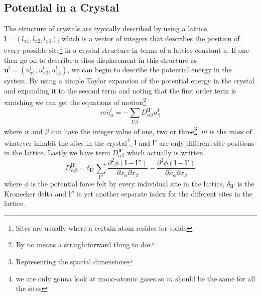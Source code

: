 \documentclass[11pt]{article}
\begin{document}
\subsection{Potential in a Crystal}
The structure of crystals are typically described by using a lattice $\mathbf{l} = (l_{x1}, l_{x2}, l_{x3})$, which is a vector of integers that describes the position of every possible site\footnote{Sites are usually where a certain atom resides for solids} in a crystal structure in terms of a lattice constant $a$. If one then go on to describe a sites displacement in this structure as $\mathbf{u}^l = (u^l_{x1},u^l_{x2},u^l_{x3})$, we can begin to describe the potential energy in the system. By using a simple Taylor expansion of the potential energy in the crystal and expanding it to the second term and noting that the first order term is vanishing we can get the equations of motion\footnote{By no means a straightforward thing  to do} 
\begin{equation}
	m \ddot{u}^l_{\alpha} = - \sum_{\mathbf{l}'\beta} D^{\mathbf{l}\mathbf{l}'}_{\alpha \beta} u^{\mathbf{l}'}_{\beta}
	\label{eq:motion}
\end{equation}
where $\alpha$ and $\beta$ can have the integer value of one, two or three\footnote{Representing the spacial dimensions}, $m$ is the mass of whatever inhabit the sites in the crystal\footnote{we are only gonna look at mono-atomic gases so $m$ should be the same for all the sites}, $\mathbf{l}$ and $\mathbf{l}'$ are only different site positions in the lattice. Lastly we have term $D^{\mathbf{l}\mathbf{l}'}_{\alpha \beta}$ which actually is written
\begin{equation}
	D^{\mathbf{l}\mathbf{l}'}_{\alpha \beta} = \delta_{\mathbf{l} \mathbf{l}'} \sum_{\mathbf{l}''} \frac{\partial^2 \phi (\mathbf{l}-\mathbf{l}'')}{\partial x_{\alpha} \partial x_{\beta}}
	-
	\frac{\partial^2 \phi (\mathbf{l}-\mathbf{l}')}{\partial x_{\alpha} \partial x_{\beta}}
\end{equation}
where $\phi$ is the potential force felt by every individual site in the lattice, $\delta_{\mathbf{l}\mathbf{l}'}$ is the Kronecker delta and $\mathbf{l}''$ is yet another separate index for the different sites in the lattice.
\end{document}
